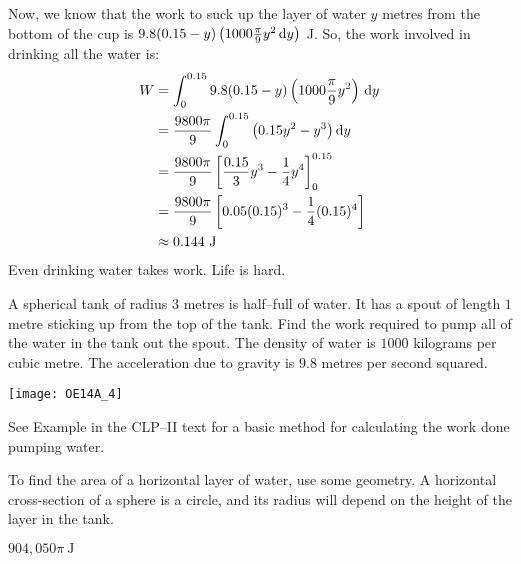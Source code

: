 \begin{solution}
Now, we know that the work to suck up the layer of water $y$ metres from the bottom of the cup is $9.8(0.15-y)\left(1000\frac{\pi}{9}y^2\,\mathrm{d}y\right)$ J. So, the work involved in drinking all the water is:
\begin{align*}
W&=\int_0^{0.15}9.8(0.15-y)\left(1000\frac{\pi}{9}y^2\right)\,\mathrm{d}y \\
&= \frac{9800\pi}{9}\int_0^{0.15}\big(0.15y^2-y^3\big)\,\mathrm{d}y\\
&= \frac{9800\pi}{9}\left[\frac{0.15}{3}y^3-\frac{1}{4}y^4 \right]_0^{0.15}
\\&= \frac{9800\pi}{9}\left[{0.05} (0.15)^3-\frac{1}{4}(0.15)^4 \right]\\
&\approx 0.144\text{ J}
\end{align*}
Even drinking water takes work. Life is hard.
\end{solution}

\begin{Mquestion}[2014A]\label{prob_s2.1:tank1}
A spherical tank of radius $3$ metres is half--full of water.
It has a spout of length $1$ metre sticking up from the top of
the tank. Find the work required to pump all of the water
in the tank out the spout. The density of water is $1000$ kilograms
per cubic metre. The acceleration due to gravity is $9.8$ metres
per second squared.

\begin{center}
       \texttt{[image: OE14A\_4]}
\end{center}

\end{Mquestion}

\begin{hint}
See Example  in the
CLP--II text for a basic method for calculating the work done pumping water.

 To find the area of a horizontal layer of water, use some geometry. A horizontal cross-section of a sphere is a circle, and its radius will depend on the height of the layer in the tank.
\end{hint}

\begin{answer}
$904{,}050\pi\ \text{J}$
\end{answer}

